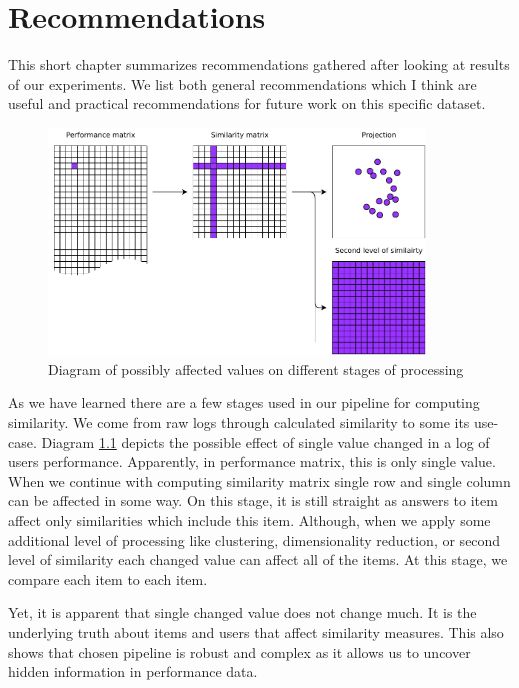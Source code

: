 \documentclass[
  digital, %
  table,   %
  nolof,     %
  nolot,     %
  nocover,
  color,
  final, %
]{fithesis3}
\begin{document}
\chapter{Recommendations}\label{recommendations}


This short chapter summarizes recommendations gathered after looking at results of our experiments. We list both general recommendations which I think are useful and practical recommendations for future work on this specific dataset.


\begin{figure}
  \includegraphics[width=10cm]{img/affected_diagram}
  \caption{Diagram of possibly affected values on different stages of processing}
  \label{fig:affected_diagram}
\end{figure}

As we have learned there are a few stages used in our pipeline for computing similarity. We come from raw logs through calculated similarity to some its use-case. Diagram \ref{fig:affected_diagram} depicts the possible effect of single value changed in a log of users performance. Apparently, in performance matrix, this is only single value. When we continue with computing similarity matrix single row and single column can be affected in some way. On this stage, it is still straight as answers to item affect only similarities which include this item. Although, when we apply some additional level of processing like clustering, dimensionality reduction, or second level of similarity each changed value can affect all of the items. At this stage, we compare each item to each item.

Yet, it is apparent that single changed value does not change much. It is the underlying truth about items and users that affect similarity measures. This also shows that chosen pipeline is robust and complex as it allows us to uncover hidden information in performance data.
\end{document}
